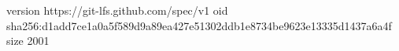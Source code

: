 version https://git-lfs.github.com/spec/v1
oid sha256:d1add7ce1a0a5f589d9a89ea427e51302ddb1e8734be9623e13335d1437a6a4f
size 2001
